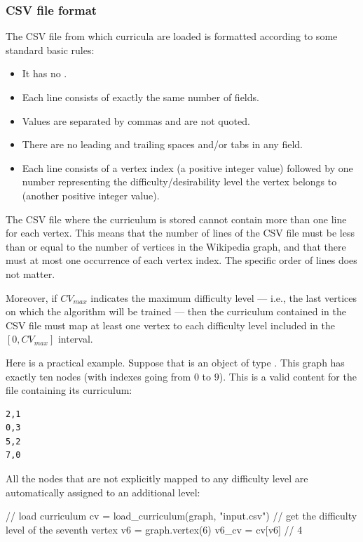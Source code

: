             \subsubsection{CSV file format}
                The CSV file from which curricula are loaded is formatted according to some standard basic rules:
                \begin{itemize}
                    \item It has no .
                    \item Each line consists of exactly the same number of fields.
                    \item Values are separated by commas and are not quoted.
                    \item There are no leading and trailing spaces and/or tabs in any field.
                    \item Each line consists of a vertex index (a positive integer value) followed by one number representing the difficulty/desirability level the vertex belongs to (another positive integer value).
                \end{itemize}
                
                The CSV file where the curriculum is stored cannot contain more than one line for each vertex. This means that the number of lines of the CSV file must be less than or equal to the number of vertices in the Wikipedia graph, and that there must at most one occurrence of each vertex index. The specific order of lines does not matter.
                
                Moreover, if \(CV_{max}\) indicates the maximum difficulty level --- i.e., the last vertices on which the algorithm will be trained --- then the curriculum contained in the CSV file must map at least one vertex to each difficulty level included in the \(\left[0,CV_{max}\right]\) interval.
                
                Here is a practical example. Suppose that  is an object of type . This graph has exactly ten nodes (with indexes going from \(0\) to \(9\)). This is a valid content for the  file containing its curriculum:
                \begin{lstlisting}
2,1
0,3
5,2
7,0
                \end{lstlisting}
                All the nodes that are not explicitly mapped to any difficulty level are automatically assigned to an additional level:
                \begin{example}
// load curriculum
cv = load_curriculum(graph, "input.csv")
// get the difficulty level of the seventh vertex
v6 = graph.vertex(6)
v6_cv = cv[v6] // 4
                \end{example}
